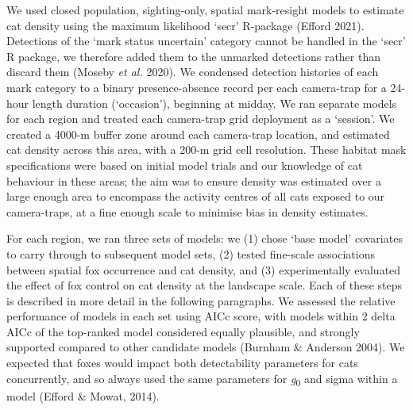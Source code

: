 \documentclass[]{elsarticle} %
\begin{document}
We used closed population, sighting-only, spatial mark-resight models to estimate cat density using the maximum likelihood `secr' R-package (Efford 2021). Detections of the `mark status uncertain' category cannot be handled in the `secr' R package, we therefore added them to the unmarked detections rather than discard them (Moseby \emph{et al.} 2020). We condensed detection histories of each mark category to a binary presence-absence record per each camera-trap for a 24-hour length duration (`occasion'), beginning at midday. We ran separate models for each region and treated each camera-trap grid deployment as a `session'. We created a 4000-m buffer zone around each camera-trap location, and estimated cat density across this area, with a 200-m grid cell resolution. These habitat mask specifications were based on initial model trials and our knowledge of cat behaviour in these areas; the aim was to ensure density was estimated over a large enough area to encompass the activity centres of all cats exposed to our camera-traps, at a fine enough scale to minimise bias in density estimates.

For each region, we ran three sets of models: we (1) chose `base model' covariates to carry through to subsequent model sets, (2) tested fine-scale associations between spatial fox occurrence and cat density, and (3) experimentally evaluated the effect of fox control on cat density at the landscape scale. Each of these steps is described in more detail in the following paragraphs. We assessed the relative performance of models in each set using AICc score, with models within 2 delta AICc of the top-ranked model considered equally plausible, and strongly supported compared to other candidate models (Burnham \& Anderson 2004). We expected that foxes would impact both detectability parameters for cats concurrently, and so always used the same parameters for \emph{g}\textsubscript{0} and sigma within a model (Efford \& Mowat, 2014).
\end{document}
